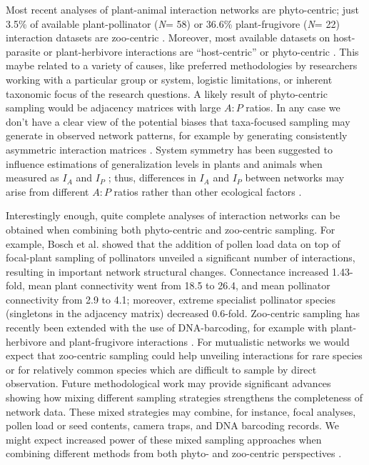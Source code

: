 \documentclass[12pt]{article}
\begin{document}
Most recent analyses of plant-animal interaction networks are phyto-centric; just 3.5\% of available plant-pollinator (\emph{N}= 58) or 36.6\% plant-frugivore (\emph{N}= 22) interaction datasets are zoo-centric \citep[see][]{Schleuning:2012eg}. Moreover, most available datasets on host-parasite or plant-herbivore interactions are ``host-centric'' or phyto-centric \citep[e.g.,][]{Thebault:2010jv,Eklof:2013ed}. This maybe related to a variety of causes, like preferred methodologies by researchers working with a particular group or system, logistic limitations, or inherent taxonomic focus of the research questions. A likely result of phyto-centric sampling would be adjacency matrices with large $A:P$ ratios. In any case we don't have a clear view of the potential biases that taxa-focused sampling may generate in observed network patterns, for example by generating consistently asymmetric interaction matrices \citep{Dormann:2009aa}. System symmetry has been suggested to influence estimations of generalization levels in plants and animals when measured as $I_A$ and $I_P$ \citep{E31/5591}; thus, differences in $I_A$ and $I_P$ between networks may arise from different $A:P$ ratios rather than other ecological factors \citep{Olesen:2002wb}. 

Interestingly enough, quite complete analyses of interaction networks can be obtained when combining both phyto-centric and zoo-centric sampling. For example, Bosch et al. \citep{Bosch:2009jga} showed that the addition of pollen load data on top of focal-plant sampling of pollinators unveiled a significant number of interactions, resulting in important network structural changes. Connectance increased 1.43-fold, mean plant connectivity went from 18.5 to 26.4, and mean pollinator connectivity from 2.9 to 4.1; moreover, extreme specialist pollinator species (singletons in the adjacency matrix) decreased 0.6-fold. Zoo-centric sampling has recently been extended with the use of DNA-barcoding, for example with plant-herbivore \citep{JuradoRivera:2009cp} and plant-frugivore interactions \citep{GonzalezVaro:2014ij}. For mutualistic networks we would expect that zoo-centric sampling could help unveiling interactions for rare species or for relatively common species which are difficult to sample by direct observation. Future methodological work may provide significant advances showing how mixing different sampling strategies strengthens the completeness of network data. These mixed strategies may combine, for instance, focal analyses, pollen load or seed contents, camera traps, and DNA barcoding records. We might expect increased power of these mixed sampling approaches when combining different methods from both phyto- and zoo-centric perspectives \citep{Bosch:2009jga,Bluthgen:2010p9}.
\end{document}

